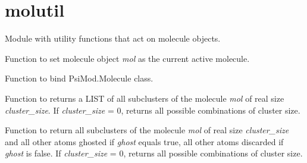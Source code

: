 \documentclass[letterpaper,10pt,english]{sphinxmanual}
\begin{document}
\section{molutil}
\label{index:module-molutil}\label{index:molutil}
Module with utility functions that act on molecule objects.

\begin{fulllineitems}
\label{index:molutil.activate}
Function to set molecule object \emph{mol} as the current active molecule.

\end{fulllineitems}


\begin{fulllineitems}
\label{index:molutil.dynamic_variable_bind}
Function to bind PsiMod.Molecule class.

\end{fulllineitems}


\begin{fulllineitems}
\label{index:molutil.extract_cluster_indexing}
Function to returns a LIST of all subclusters of the molecule \emph{mol} of
real size \emph{cluster\_size}. If \emph{cluster\_size} = 0, returns all possible
combinations of cluster size.

\end{fulllineitems}


\begin{fulllineitems}
\label{index:molutil.extract_clusters}
Function to return all subclusters of the molecule \emph{mol} of
real size \emph{cluster\_size} and all other atoms ghosted if \emph{ghost}
equals true, all other atoms discarded if \emph{ghost} is false. If
\emph{cluster\_size} = 0, returns all possible combinations of cluster size.

\end{fulllineitems}
\end{document}
